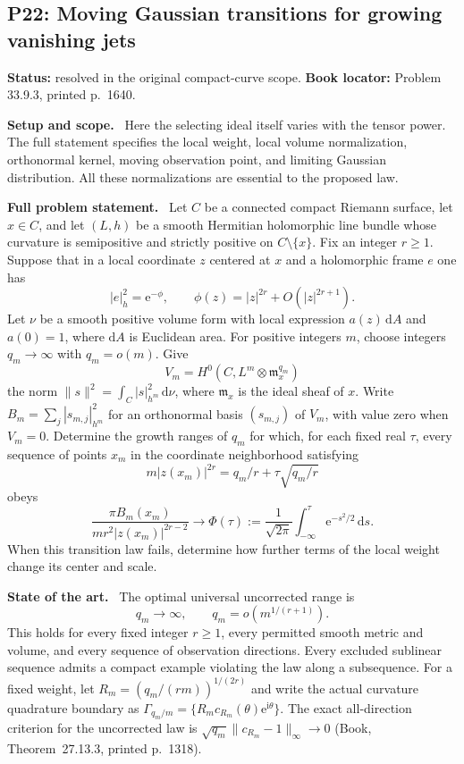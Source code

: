 \documentclass[11pt]{article}
\newcommand{\field}[1]{\par\medskip\noindent\textbf{#1.}\ }
\begin{document}
\subsection{P22: Moving Gaussian transitions for growing vanishing jets}
\label{P22}
\noindent\textbf{Status:} resolved in the original compact-curve scope. \textbf{Book locator:} Problem 33.9.3, printed p.~1640.
\field{Setup and scope} Here the selecting ideal itself varies with the tensor power. The full statement specifies the local weight, local volume normalization, orthonormal kernel, moving observation point, and limiting Gaussian distribution. All these normalizations are essential to the proposed law.
\field{Full problem statement} Let $C$ be a connected compact Riemann surface, let $x\in C$, and let $(L,h)$ be a smooth Hermitian holomorphic line bundle whose curvature is semipositive and strictly positive on $C\setminus\{x\}$. Fix an integer $r\geq1$. Suppose that in a local coordinate $z$ centered at $x$ and a holomorphic frame $e$ one has
\[
 |e|_h^2=\mathrm{e}^{-\phi},\qquad
 \phi(z)=|z|^{2r}+O(|z|^{2r+1}).
\]
Let $\nu$ be a smooth positive volume form with local expression $a(z)\,\mathrm{d}A$ and $a(0)=1$, where $\mathrm{d}A$ is Euclidean area. For positive integers $m$, choose integers $q_m\to\infty$ with $q_m=o(m)$. Give
\[
 V_m=H^0(C,L^m\otimes\mathfrak m_x^{q_m})
\]
the norm $\|s\|^2=\int_C|s|_{h^m}^2\,\mathrm{d}\nu$, where $\mathfrak m_x$ is the ideal sheaf of $x$. Write $B_m=\sum_j|s_{m,j}|_{h^m}^2$ for an orthonormal basis $(s_{m,j})$ of $V_m$, with value zero when $V_m=0$. Determine the growth ranges of $q_m$ for which, for each fixed real $\tau$, every sequence of points $x_m$ in the coordinate neighborhood satisfying
\[
 m|z(x_m)|^{2r}=q_m/r+\tau\sqrt{q_m/r}
\]
obeys
\[
 \frac{\pi B_m(x_m)}{mr^2|z(x_m)|^{2r-2}}
 \longrightarrow
 \Phi(\tau):=\frac1{\sqrt{2\pi}}\int_{-\infty}^{\tau}
                         \mathrm{e}^{-s^2/2}\,\mathrm{d}s.
\]
When this transition law fails, determine how further terms of the local weight change its center and scale.
\field{State of the art} The optimal universal uncorrected range is
\[
 q_m\longrightarrow\infty,\qquad q_m=o(m^{1/(r+1)}).
\]
This holds for every fixed integer $r\geq1$, every permitted smooth metric and volume, and every sequence of observation directions. Every excluded sublinear sequence admits a compact example violating the law along a subsequence. For a fixed weight, let $R_m=(q_m/(rm))^{1/(2r)}$ and write the actual curvature quadrature boundary as $\Gamma_{q_m/m}=\{R_m c_{R_m}(\theta)\mathrm e^{\mathrm i\theta}\}$. The exact all-direction criterion for the uncorrected law is $\sqrt{q_m}\|c_{R_m}-1\|_\infty\to0$ (Book, Theorem~27.13.3, printed p.~1318).
\end{document}
